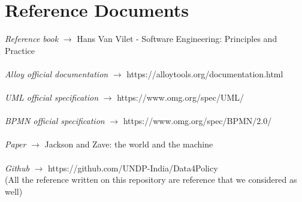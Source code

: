 \documentclass[10pt]{report}
\begin{document}
    \section{Reference Documents}
    \emph{Reference book} $\rightarrow$ Hans Van Vilet - Software Engineering: Principles and Practice
    \\ \\
    \emph{Alloy official documentation} $\rightarrow$ https://alloytools.org/documentation.html
    \\ \\
    \emph{UML official specification} $\rightarrow$ https://www.omg.org/spec/UML/
    \\ \\
    \emph{BPMN official specification} $\rightarrow$ https://www.omg.org/spec/BPMN/2.0/
    \\ \\
    \emph{Paper} $\rightarrow$ Jackson and Zave: the world and the machine\\ \\
    \emph{Github} $\rightarrow$ https://github.com/UNDP-India/Data4Policy\\ (All the reference written on this repository are reference that we considered as well)
\end{document}
